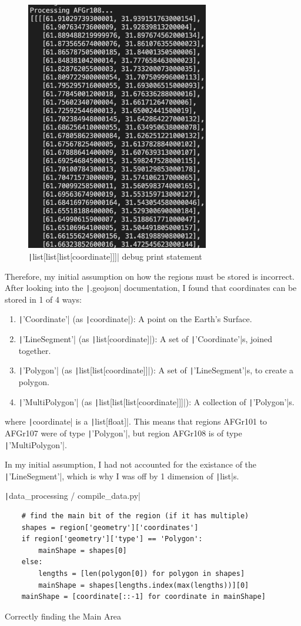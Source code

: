 \documentclass[12pt]{report}
\newcommand{\pil}[1]{\protect\texttt|#1|}
\begin{document}
\begin{figure}[H]
\centering
\includegraphics[width=8cm]{ss5.8.png}
\caption{\pil{list[list[list[coordinate]]]} debug print statement}\label{fig:ss5.8}
\end{figure}

Therefore, my initial assumption on how the regions must be stored is incorrect. After looking into the \pil{.geojson} documentation, I found that coordinates can be stored in 1 of 4 ways:
\begin{enumerate}
    \item \pil{'Coordinate'} (as \pil{coordinate}): A point on the Earth's Surface.
    \item \pil{'LineSegment'} (as \pil{list[coordinate]}): A set of \pil{'Coordinate'}s, joined together.
    \item \pil{'Polygon'} (as \pil{list[list[coordinate]]}): A set of \pil{'LineSegment'}s, to create a polygon.
    \item \pil{'MultiPolygon'} (as \pil{list[list[list[coordinate]]]}): A collection of \pil{'Polygon'}s.
\end{enumerate}
where \pil{coordinate} is a \pil{list[float]}. This means that regions AFGr101 to AFGr107 were of type \pil{'Polygon'}, but region AFGr108 is of type \pil{'MultiPolygon'}.

In my initial assumption, I had not accounted for the existance of the \pil{'LineSegment'}, which is why I was off by 1 dimension of \pil{list}s.

\begin{listing}[H]
\pil{data_processing / compile_data.py}
\begin{verbatim}
    # find the main bit of the region (if it has multiple)
    shapes = region['geometry']['coordinates']
    if region['geometry']['type'] == 'Polygon':
        mainShape = shapes[0]
    else:
        lengths = [len(polygon[0]) for polygon in shapes]
        mainShape = shapes[lengths.index(max(lengths))][0]
    mainShape = [coordinate[::-1] for coordinate in mainShape]
\end{verbatim}
\caption{Correctly finding the Main Area}\label{cs:findMainAreaAgain}
\end{listing}
\end{document}

